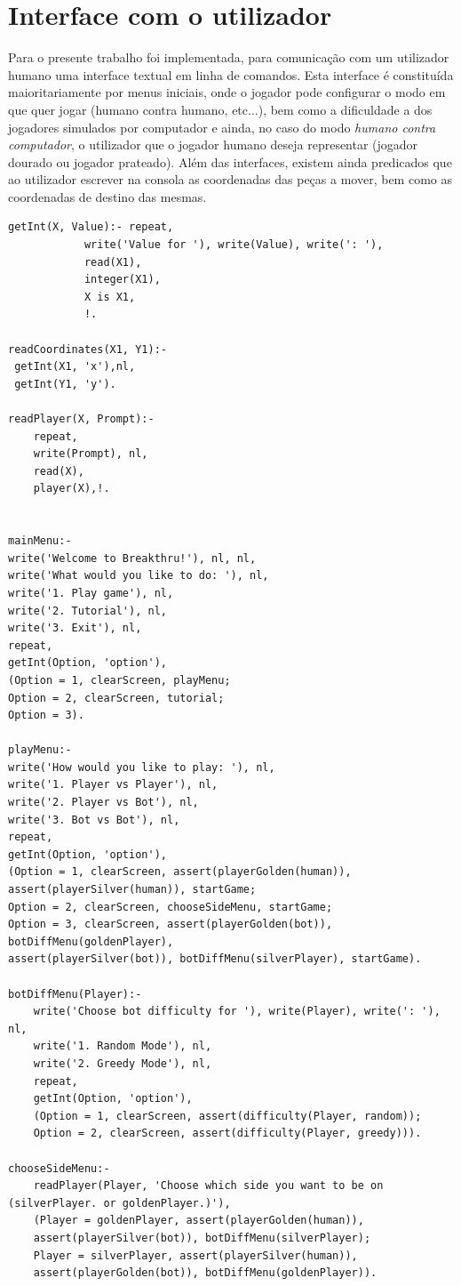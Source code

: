 \documentclass[a4paper]{article}
\begin{document}
\section{Interface com o utilizador}
Para o presente trabalho foi implementada, para comunicação com um utilizador humano uma interface textual em linha de comandos. Esta interface é constituída maioritariamente por menus iniciais, onde o jogador pode configurar o modo em que quer jogar (humano contra humano, etc...), bem como a dificuldade a dos jogadores simulados por computador e ainda, no caso do modo \textit{humano contra computador}, o utilizador que o jogador humano deseja representar (jogador dourado ou jogador prateado).
Além das interfaces, existem ainda predicados que ao utilizador escrever na consola as coordenadas das peças a mover, bem como as coordenadas de destino das mesmas.

\begin{verbatim}
getInt(X, Value):- repeat,
			write('Value for '), write(Value), write(': '),
			read(X1),
			integer(X1),
			X is X1,
			!.

readCoordinates(X1, Y1):-
 getInt(X1, 'x'),nl,
 getInt(Y1, 'y').

readPlayer(X, Prompt):-
	repeat,
	write(Prompt), nl,
	read(X),
	player(X),!.


mainMenu:-
write('Welcome to Breakthru!'), nl, nl,
write('What would you like to do: '), nl,
write('1. Play game'), nl,
write('2. Tutorial'), nl,
write('3. Exit'), nl,
repeat,
getInt(Option, 'option'),
(Option = 1, clearScreen, playMenu;
Option = 2, clearScreen, tutorial;
Option = 3).

playMenu:-
write('How would you like to play: '), nl,
write('1. Player vs Player'), nl,
write('2. Player vs Bot'), nl,
write('3. Bot vs Bot'), nl,
repeat,
getInt(Option, 'option'),
(Option = 1, clearScreen, assert(playerGolden(human)),
assert(playerSilver(human)), startGame;
Option = 2, clearScreen, chooseSideMenu, startGame;
Option = 3, clearScreen, assert(playerGolden(bot)), botDiffMenu(goldenPlayer),
assert(playerSilver(bot)), botDiffMenu(silverPlayer), startGame).

botDiffMenu(Player):-
	write('Choose bot difficulty for '), write(Player), write(': '), nl,
	write('1. Random Mode'), nl,
	write('2. Greedy Mode'), nl,
	repeat,
	getInt(Option, 'option'),
	(Option = 1, clearScreen, assert(difficulty(Player, random));
	Option = 2, clearScreen, assert(difficulty(Player, greedy))).

chooseSideMenu:-
	readPlayer(Player, 'Choose which side you want to be on (silverPlayer. or goldenPlayer.)'),
	(Player = goldenPlayer, assert(playerGolden(human)),
	assert(playerSilver(bot)), botDiffMenu(silverPlayer);
	Player = silverPlayer, assert(playerSilver(human)),
	assert(playerGolden(bot)), botDiffMenu(goldenPlayer)).
\end{verbatim}
\end{document}
